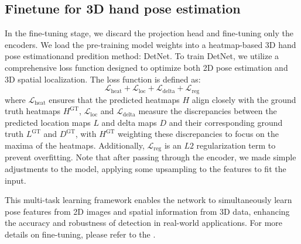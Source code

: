 \subsection{Finetune for 3D hand pose estimation}\label{sec:appendix_fine_tuning}
In the fine-tuning stage, we discard the projection head and fine-tuning only the encoders. We load the pre-training model weights into a heatmap-based 3D hand pose estimationand predition method: DetNet\citep{zhou:cvpr20}. To train DetNet, we utilize a comprehensive loss function designed to optimize both 2D pose estimation and 3D spatial localization. The loss function is defined as:
%
\begin{equation}
\label{eq:L_total}
\mathcal{L}_\mathrm{heat} +
\mathcal{L}_\mathrm{loc} +
\mathcal{L}_\mathrm{delta} +
\mathcal{L}_\mathrm{reg}
\end{equation}
%
where $\mathcal{L}_\mathrm{heat}$ ensures that the predicted heatmaps $H$ align closely with the ground truth heatmaps $H^\mathrm{GT}$, $\mathcal{L}_\mathrm{loc}$ and $\mathcal{L}_\mathrm{delta}$ measure the discrepancies between the predicted location maps $L$ and delta maps $D$ and their corresponding ground truth $L^\mathrm{GT}$ and $D^\mathrm{GT}$, with $H^\mathrm{GT}$ weighting these discrepancies to focus on the maxima of the heatmaps. Additionally, $\mathcal{L}_\mathrm{reg}$ is an $L2$ regularization term to prevent overfitting. Note that after passing through the encoder, we made simple adjustments to the model, applying some upsampling to the features to fit the input.

This multi-task learning framework enables the network to simultaneously learn pose features from 2D images and spatial information from 3D data, enhancing the accuracy and robustness of detection in real-world applications. For more details on fine-tuning, please refer to the \citep{zhou:cvpr20}.
